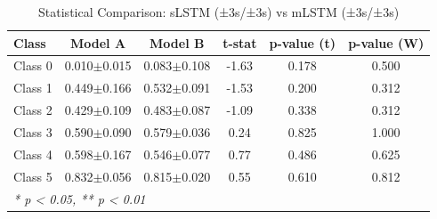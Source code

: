 \begin{table}[htbp]
\centering
\caption{Statistical Comparison: sLSTM (±3s/±3s) vs mLSTM (±3s/±3s)}
\label{tab:comparison_class_slstm_±3s_±3s_vs_mlstm_±3s_±3s}
\begin{tabular}{lccccc}
\toprule
\textbf{Class} & \textbf{Model A} & \textbf{Model B} & \textbf{t-stat} & \textbf{p-value (t)} & \textbf{p-value (W)} \\
\midrule
Class 0 & 0.010$\pm$0.015 & 0.083$\pm$0.108 & -1.63 & 0.178 & 0.500 \\
Class 1 & 0.449$\pm$0.166 & 0.532$\pm$0.091 & -1.53 & 0.200 & 0.312 \\
Class 2 & 0.429$\pm$0.109 & 0.483$\pm$0.087 & -1.09 & 0.338 & 0.312 \\
Class 3 & 0.590$\pm$0.090 & 0.579$\pm$0.036 & 0.24 & 0.825 & 1.000 \\
Class 4 & 0.598$\pm$0.167 & 0.546$\pm$0.077 & 0.77 & 0.486 & 0.625 \\
Class 5 & 0.832$\pm$0.056 & 0.815$\pm$0.020 & 0.55 & 0.610 & 0.812 \\
\bottomrule
\multicolumn{6}{l}{\textit{* p < 0.05, ** p < 0.01}} \\
\end{tabular}
\end{table}
